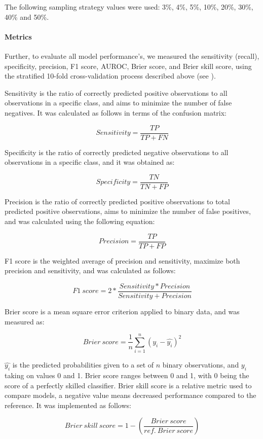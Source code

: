 The following sampling strategy values were used: 3\%, 4\%, 5\%, 10\%, 20\%, 30\%, 40\% and 50\%.

\paragraph{Metrics}
\label{sec:metrics_methods}

Further, to evaluate all model performance’s, we measured the sensitivity (recall), specificity, precision, F1 score, AUROC, Brier score, and Brier skill score, using the stratified 10-fold cross-validation process described above (see ). 

Sensitivity is the ratio of correctly predicted positive observations to all observations in a specific class, and aims to minimize the number of false negatives. It was calculated as follows in terms of the confusion matrix:

\[ Sensitivity= \frac{TP}{TP+FN}  \]

Specificity is the ratio of correctly predicted negative observations to all observations in a specific class, and it was obtained as:

\[ Specificity= \frac{TN}{TN+FP} \]

Precision is the ratio of correctly predicted positive observations to total predicted positive observations, aims to minimize the number of false positives, and was calculated using the following equation:

\[ Precision= \frac{TP}{TP+FP}  \]

F1 score is the weighted average of precision and sensitivity, maximize both precision and sensitivity, and was calculated as follows:

\[ F1\ score= 2*\frac{Sensitivity*Precision}{Sensitivity+Precision}  \]

Brier score is a mean square error criterion applied to binary data, and was measured as: 

\[ Brier\ score= \frac{1}{n}\sum_{i=1}^n(y_i-\hat{y_i})^2  \]

$\hat{y_i}$ is the predicted probabilities given to a set of $n$ binary observations, and $y_i$ taking on values 0 and 1. Brier score ranges between 0 and 1, with 0 being the score of a perfectly skilled classifier. Brier skill score is a relative metric used to compare models, a negative value means decreased performance compared to the reference. It was implemented as follows: 

\[ Brier\ skill\ score= 1 - (\frac{Brier\ score}{ref.\ Brier\ score}) \]

